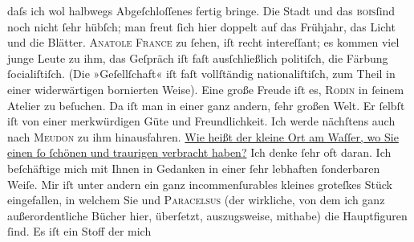 \begin{ledgroupsized}[t]{13cm}
               daſs ich wol halbwegs Abgeſchloſſenes fertig bringe.\pend
           \pstart
           Die Stadt und das \textsc{bois}ſind noch nicht ſehr hübſch; man freut ſich hier
               doppelt auf das Frühjahr, das Licht und die Blätter.\pend
           \pstart
           \textsc{Anatole France} zu ſehen, iſt recht intereſſant; es kommen {\pb}viel junge Leute zu ihm, das
               Geſpräch iſt faſt ausſchließlich politiſch, die Färbung ſocialiſtiſch. (Die
               »Geſellſchaft« iſt faſt vollſtändig nationaliſtiſch, zum Theil in einer widerwärtigen
               bornierten Weise).\pend
           \pstart
           Eine große Freude iſt es, \textsc{Rodin} in ſeinem Atelier zu beſuchen. Da iſt man in einer ganz andern, ſehr großen
               Welt. Er ſelbſt iſt von einer merkwürdigen Güte und Freundlichkeit. Ich {\pb}werde  nächſtens auch nach \textsc{Meudon} zu ihm hinausfahren.\pend
           \pstart
           \uline{Wie heißt der kleine Ort am Waſſer, wo Sie einen ſo ſchönen und traurigen
                     \label{K_L01021-1v}\label{K_L01021-1h} verbracht haben?} Ich denke ſehr oft daran.\pend
           \pstart
           Ich beſchäftige mich mit Ihnen in Gedanken in einer ſehr lebhaften ſonderbaren Weiſe.
               Mir iſt unter andern ein ganz incommenſurables kleines groteſkes Stück eingefallen, in welchem Sie und \textsc{Paracelsus} (der wirkliche, von dem ich ganz {\pb}außerordentliche Bücher hier,
               überſetzt, auszugsweise, mithabe) die Hauptfiguren ſind. Es iſt ein Stoff der mich

\end{ledgroupsized}
